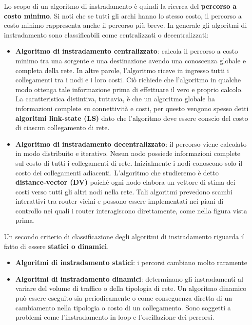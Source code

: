 \documentclass[11pt,a4paper]{book}
\begin{document}
Lo scopo di un algoritmo di instradamento è quindi la ricerca del \textbf{percorso a costo minimo}. Si noti che se tutti gli archi hanno lo stesso costo, il percorso a costo minimo rappresenta anche il percorso più breve. In generale gli algoritmi di instradamento sono classificabili come centralizzati o decentralizzati:
\begin{itemize}
	\item \textbf{Algoritmo di instradamento centralizzato}: calcola il percorso a costo minimo tra una sorgente e una destinazione avendo una conoscenza globale e completa della rete. In altre parole, l'algoritmo riceve in ingresso tutti i collegamenti tra i nodi e i loro costi. Ciò richiede che l'algoritmo in qualche modo ottenga tale informazione prima di effettuare il vero e proprio calcolo. La caratteristica distintiva, tuttavia, è che un algoritmo globale ha informazioni complete su connettività e costi, per questo vengono spesso detti \textbf{algoritmi link-state (LS)} dato che l'algoritmo deve essere conscio del costo di ciascun collegamento di rete.
	\item \textbf{Algoritmo di instradamento decentralizzato}: il percorso viene calcolato in modo distribuito e iterativo. Nesun nodo possiede informazioni complete sul costo di tutti i collegamenti di rete. Inizialmente i nodi conoscono solo il costo dei collegamenti adiacenti. L'algoritmo che studieremo è detto \textbf{distance-vector (DV)} poichè ogni nodo elabora un vettore di stima dei costi verso tutti gli altri nodi nella rete. Tali algoritmi prevedono scambi interattivi tra router vicini e possono essere implementati nei piani di controllo nei quali i router interagiscono direttamente, come nella figura vista prima.
\end{itemize}
Un secondo criterio di classificazione degli algoritmi di instradamento riguarda il fatto di essere \textbf{statici o dinamici}.
\begin{itemize}
	\item \textbf{Algoritmi di instradamento statici}: i percorsi cambiano molto raramente
	\item \textbf{Algoritmi di instradamento dinamici}: determinano gli instradamenti al variare del volume di traffico o della tipologia di rete. Un algoritmo dinamico può essere eseguito sia periodicamente o come conseguenza diretta di un cambiamento nella tipologia o costo di un collegamento. Sono soggetti a problemi come l'instradamento in loop e l'oscillazione dei percorsi.
\end{itemize}
\end{document}
